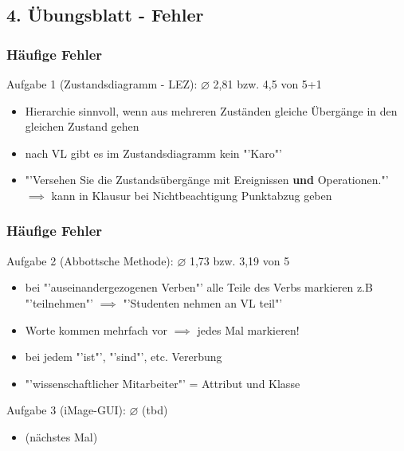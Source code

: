 \documentclass[18pt]{beamer}
\begin{document}
	\subsection{4. Übungsblatt - Fehler}
	\begin{frame}
		\frametitle{Häufige Fehler}
		\begin{block}{Aufgabe 1 (Zustandsdiagramm - LEZ): $\diameter$ 2,81 bzw. 4,5 von 5+1}
			\begin{itemize}
				\pause 
				\item Hierarchie sinnvoll, wenn aus mehreren Zuständen gleiche Übergänge in den gleichen Zustand gehen \pause
				\item nach VL gibt es im Zustandsdiagramm kein "'Karo"' \pause
				\item "'Versehen Sie die Zustandsübergänge mit Ereignissen \textbf{und} Operationen."' \pause
				\linebreak $\implies$ kann in Klausur bei Nichtbeachtigung Punktabzug geben
			\end{itemize}
		\end{block}
	\end{frame}

	\begin{frame}
		\frametitle{Häufige Fehler}
		\begin{block}{Aufgabe 2 (Abbottsche Methode): $\diameter$ 1,73 bzw. 3,19 von 5}
			\begin{itemize}
				\pause 
				\item bei "'auseinandergezogenen Verben"' alle Teile des Verbs markieren \pause
				\linebreak z.B "'teilnehmen"' $\implies$ "'Studenten nehmen an VL teil"' \pause
				\item Worte kommen mehrfach vor $\implies$ jedes Mal markieren! \pause
				\item bei jedem "'ist"', "'sind"', etc. Vererbung \pause
				\item "'wissenschaftlicher Mitarbeiter"' = Attribut und Klasse
			\end{itemize}
		\end{block}
		\pause 
		\begin{block}{Aufgabe 3 (iMage-GUI): $\diameter$ (tbd)}
			\begin{itemize}
				\item	(nächstes Mal)
			\end{itemize}
		\end{block}
	\end{frame}
\end{document}
